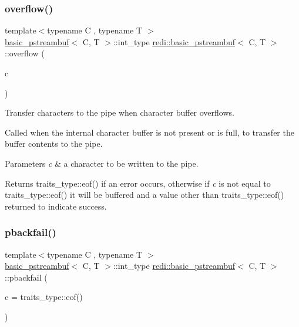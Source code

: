 \subsubsection{\texorpdfstring{overflow()}{overflow()}}
{\footnotesize\ttfamily template$<$typename C , typename T $>$ \\
\mbox{\hyperlink{classredi_1_1basic__pstreambuf}{basic\+\_\+pstreambuf}}$<$ C, T $>$\+::int\+\_\+type \mbox{\hyperlink{classredi_1_1basic__pstreambuf}{redi\+::basic\+\_\+pstreambuf}}$<$ C, T $>$\+::overflow (\begin{DoxyParamCaption}\item[{int\+\_\+type}]{c }\end{DoxyParamCaption})\hspace{0.3cm}{\ttfamily [protected]}}



Transfer characters to the pipe when character buffer overflows. 

Called when the internal character buffer is not present or is full, to transfer the buffer contents to the pipe.


\begin{DoxyParams}{Parameters}
{\em c} & a character to be written to the pipe. \\
\hline
\end{DoxyParams}
\begin{DoxyReturn}{Returns}
{\ttfamily traits\+\_\+type\+::eof()} if an error occurs, otherwise if {\itshape c} is not equal to {\ttfamily traits\+\_\+type\+::eof()} it will be buffered and a value other than {\ttfamily traits\+\_\+type\+::eof()} returned to indicate success. 
\end{DoxyReturn}
\mbox{\label{classredi_1_1basic__pstreambuf_accbff787187463c3ff1e76a3abb75adc}} 
\subsubsection{\texorpdfstring{pbackfail()}{pbackfail()}}
{\footnotesize\ttfamily template$<$typename C , typename T $>$ \\
\mbox{\hyperlink{classredi_1_1basic__pstreambuf}{basic\+\_\+pstreambuf}}$<$ C, T $>$\+::int\+\_\+type \mbox{\hyperlink{classredi_1_1basic__pstreambuf}{redi\+::basic\+\_\+pstreambuf}}$<$ C, T $>$\+::pbackfail (\begin{DoxyParamCaption}\item[{int\+\_\+type}]{c = {\ttfamily traits\+\_\+type\+:\+:eof()} }\end{DoxyParamCaption})\hspace{0.3cm}{\ttfamily [protected]}}



